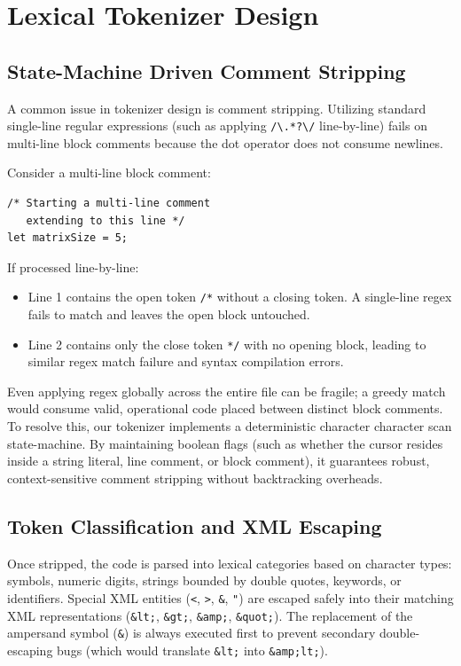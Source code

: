 \documentclass[11pt,a4paper]{article}
\begin{document}
\section{Lexical Tokenizer Design}

\subsection{State-Machine Driven Comment Stripping}

A common issue in tokenizer design is comment stripping. Utilizing standard single-line regular expressions (such as applying \texttt{/\textbackslash*.*?\textbackslash*/} line-by-line) fails on multi-line block comments because the dot operator does not consume newlines.

Consider a multi-line block comment:
\begin{lstlisting}[style=pseudocode]
/* Starting a multi-line comment
   extending to this line */
let matrixSize = 5;
\end{lstlisting}

If processed line-by-line:
\begin{itemize}
    \item Line 1 contains the open token \texttt{/*} without a closing token. A single-line regex fails to match and leaves the open block untouched.
    \item Line 2 contains only the close token \texttt{*/} with no opening block, leading to similar regex match failure and syntax compilation errors.
\end{itemize}

Even applying regex globally across the entire file can be fragile; a greedy match would consume valid, operational code placed between distinct block comments. To resolve this, our tokenizer implements a deterministic character character scan state-machine. By maintaining boolean flags (such as whether the cursor resides inside a string literal, line comment, or block comment), it guarantees robust, context-sensitive comment stripping without backtracking overheads.

\subsection{Token Classification and XML Escaping}

Once stripped, the code is parsed into lexical categories based on character types: symbols, numeric digits, strings bounded by double quotes, keywords, or identifiers. Special XML entities (\texttt{<}, \texttt{>}, \texttt{\&}, \texttt{"}) are escaped safely into their matching XML representations (\texttt{\&lt;}, \texttt{\&gt;}, \texttt{\&amp;}, \texttt{\&quot;}). The replacement of the ampersand symbol (\texttt{\&}) is always executed first to prevent secondary double-escaping bugs (which would translate \texttt{\&lt;} into \texttt{\&amp;lt;}).
\end{document}
